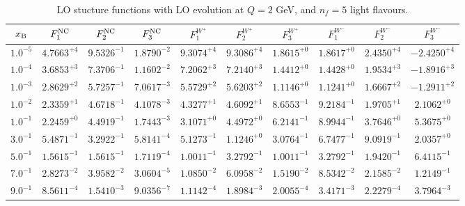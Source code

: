 \begin{table}[h]
\begin{adjustbox}{width=\textwidth}
\begin{tabular}{|c||c|c|c|c|c|c|c|c|c|}
\hline
$x_{\rm B}$ & $F_1^{\rm NC}$ & $F_2^{\rm NC}$ & $F_3^{\rm NC}$ & $F_1^{W^+}$ & $F_2^{W^+}$ & $F_3^{W^+}$ & $F_1^{W^-}$ & $F_2^{W^-}$ & $F_3^{W^-}$ \\
\hline
$ 1.0^{-5}$ & $ 4.7663^{+4}$ & $ 9.5326^{-1}$ & $ 1.8790^{-2}$ & $ 9.3074^{+4}$ & $ 9.3086^{+4}$ & $ 1.8615^{+0}$ & $ 1.8617^{+0}$ & $ 2.4350^{+4}$ & $-2.4250^{+4}$ \\
$ 1.0^{-4}$ & $ 3.6853^{+3}$ & $ 7.3706^{-1}$ & $ 1.1602^{-2}$ & $ 7.2062^{+3}$ & $ 7.2140^{+3}$ & $ 1.4412^{+0}$ & $ 1.4428^{+0}$ & $ 1.9534^{+3}$ & $-1.8916^{+3}$ \\
$ 1.0^{-3}$ & $ 2.8629^{+2}$ & $ 5.7257^{-1}$ & $ 7.0617^{-3}$ & $ 5.5729^{+2}$ & $ 5.6203^{+2}$ & $ 1.1146^{+0}$ & $ 1.1241^{+0}$ & $ 1.6667^{+2}$ & $-1.2911^{+2}$ \\
$ 1.0^{-2}$ & $ 2.3359^{+1}$ & $ 4.6718^{-1}$ & $ 4.1078^{-3}$ & $ 4.3277^{+1}$ & $ 4.6092^{+1}$ & $ 8.6553^{-1}$ & $ 9.2184^{-1}$ & $ 1.9705^{+1}$ & $ 2.1062^{+0}$ \\
$ 1.0^{-1}$ & $ 2.2459^{+0}$ & $ 4.4919^{-1}$ & $ 1.7443^{-3}$ & $ 3.1071^{+0}$ & $ 4.4972^{+0}$ & $ 6.2141^{-1}$ & $ 8.9944^{-1}$ & $ 3.7646^{+0}$ & $ 5.3675^{+0}$ \\
$ 3.0^{-1}$ & $ 5.4871^{-1}$ & $ 3.2922^{-1}$ & $ 5.8141^{-4}$ & $ 5.1273^{-1}$ & $ 1.1246^{+0}$ & $ 3.0764^{-1}$ & $ 6.7477^{-1}$ & $ 9.0919^{-1}$ & $ 2.0357^{+0}$ \\
$ 5.0^{-1}$ & $ 1.5615^{-1}$ & $ 1.5615^{-1}$ & $ 1.7119^{-4}$ & $ 1.0011^{-1}$ & $ 3.2792^{-1}$ & $ 1.0011^{-1}$ & $ 3.2792^{-1}$ & $ 1.9420^{-1}$ & $ 6.4115^{-1}$ \\
$ 7.0^{-1}$ & $ 2.8273^{-2}$ & $ 3.9582^{-2}$ & $ 3.0604^{-5}$ & $ 1.0850^{-2}$ & $ 6.0958^{-2}$ & $ 1.5190^{-2}$ & $ 8.5342^{-2}$ & $ 2.1585^{-2}$ & $ 1.2149^{-1}$ \\
$ 9.0^{-1}$ & $ 8.5611^{-4}$ & $ 1.5410^{-3}$ & $ 9.0356^{-7}$ & $ 1.1142^{-4}$ & $ 1.8984^{-3}$ & $ 2.0055^{-4}$ & $ 3.4171^{-3}$ & $ 2.2279^{-4}$ & $ 3.7964^{-3}$ \\
\hline
\end{tabular}
\end{adjustbox}\caption{LO stucture functions with LO evolution at $Q = 2$ GeV, and $n_f=5$ light flavours.}
\label{tab:N0LO-Q2}
\end{table}



